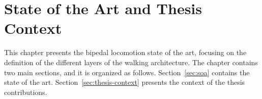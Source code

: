 \chapter{State of the Art and Thesis Context\label{chapter:context}}

This chapter presents the bipedal locomotion state of the art, focusing on the definition of the different layers of the walking architecture. The chapter contains two main sections, and it is organized as follows. Section~\ref{sec:soa} contains the state of the art. Section~\ref{sec:thesis-context} presents the context of the thesis contributions.


